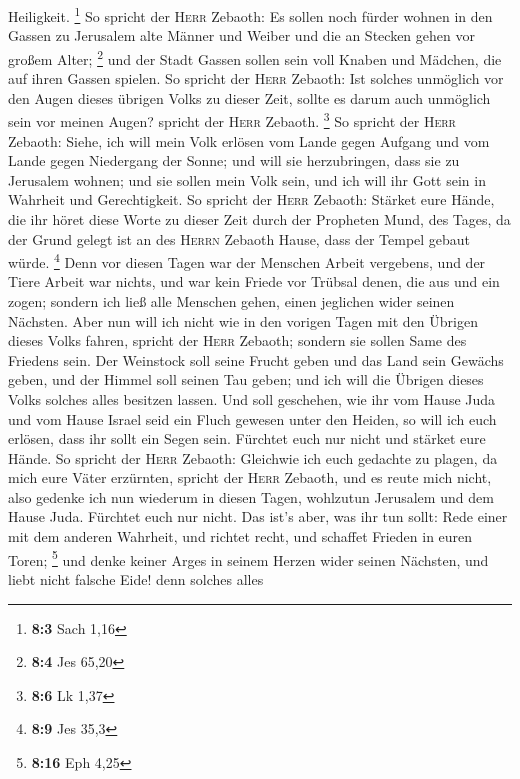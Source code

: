 Heiligkeit. \footnote{\textbf{8:3} Sach 1,16}  So spricht
der \textsc{Herr} Zebaoth: Es sollen noch fürder wohnen in den Gassen zu
Jerusalem alte Männer und Weiber und die an Stecken gehen vor großem
Alter; \footnote{\textbf{8:4} Jes 65,20}  und der Stadt
Gassen sollen sein voll Knaben und Mädchen, die auf ihren Gassen
spielen.  So spricht der \textsc{Herr} Zebaoth: Ist
solches unmöglich vor den Augen dieses übrigen Volks zu dieser Zeit,
sollte es darum auch unmöglich sein vor meinen Augen? spricht der
\textsc{Herr} Zebaoth. \footnote{\textbf{8:6} Lk 1,37}  So
spricht der \textsc{Herr} Zebaoth: Siehe, ich will mein Volk erlösen vom
Lande gegen Aufgang und vom Lande gegen Niedergang der Sonne;
 und will sie herzubringen, dass sie zu Jerusalem wohnen;
und sie sollen mein Volk sein, und ich will ihr Gott sein in Wahrheit
und Gerechtigkeit.  So spricht der \textsc{Herr} Zebaoth:
Stärket eure Hände, die ihr höret diese Worte zu dieser Zeit durch der
Propheten Mund, des Tages, da der Grund gelegt ist an des \textsc{Herrn}
Zebaoth Hause, dass der Tempel gebaut würde. \footnote{\textbf{8:9} Jes
  35,3}  Denn vor diesen Tagen war der Menschen Arbeit
vergebens, und der Tiere Arbeit war nichts, und war kein Friede vor
Trübsal denen, die aus und ein zogen; sondern ich ließ alle Menschen
gehen, einen jeglichen wider seinen Nächsten.  Aber nun
will ich nicht wie in den vorigen Tagen mit den Übrigen dieses Volks
fahren, spricht der \textsc{Herr} Zebaoth;  sondern sie
sollen Same des Friedens sein. Der Weinstock soll seine Frucht geben und
das Land sein Gewächs geben, und der Himmel soll seinen Tau geben; und
ich will die Übrigen dieses Volks solches alles besitzen lassen.
 Und soll geschehen, wie ihr vom Hause Juda und vom Hause
Israel seid ein Fluch gewesen unter den Heiden, so will ich euch
erlösen, dass ihr sollt ein Segen sein. Fürchtet euch nur nicht und
stärket eure Hände.  So spricht der \textsc{Herr}
Zebaoth: Gleichwie ich euch gedachte zu plagen, da mich eure Väter
erzürnten, spricht der \textsc{Herr} Zebaoth, und es reute mich nicht,
 also gedenke ich nun wiederum in diesen Tagen, wohlzutun
Jerusalem und dem Hause Juda. Fürchtet euch nur nicht. 
Das ist's aber, was ihr tun sollt: Rede einer mit dem anderen Wahrheit,
und richtet recht, und schaffet Frieden in euren Toren; \footnote{\textbf{8:16}
  Eph 4,25}  und denke keiner Arges in seinem Herzen
wider seinen Nächsten, und liebt nicht falsche Eide! denn solches alles

